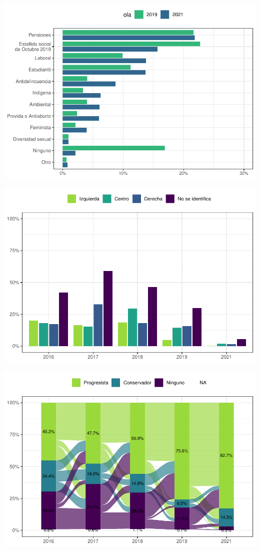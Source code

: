 \documentclass[
  12pt,
]{book}
\begin{document}
\begin{center}\includegraphics{reporte-elsoc_files/figure-latex/unnamed-chunk-6-1} \end{center}

\begin{center}\includegraphics{reporte-elsoc_files/figure-latex/unnamed-chunk-7-1} \end{center}

\begin{center}\includegraphics{reporte-elsoc_files/figure-latex/unnamed-chunk-8-1} \end{center}
\end{document}
